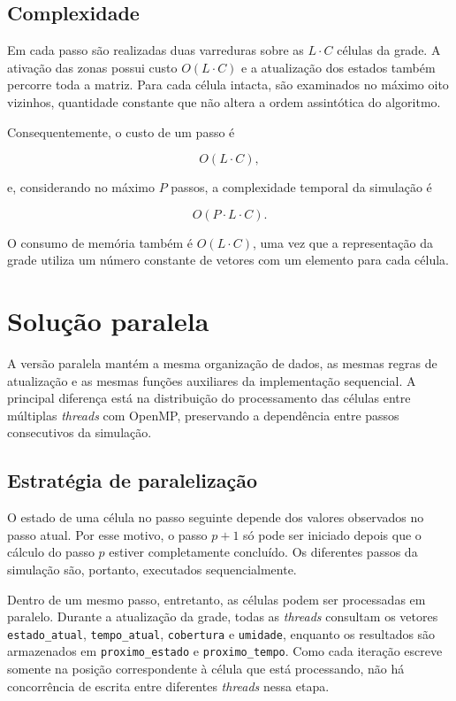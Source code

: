 \documentclass[11pt,a4paper]{article}
\begin{document}
\subsection{Complexidade}

Em cada passo são realizadas duas varreduras sobre as $L \cdot C$ células da grade. A ativação das zonas possui custo $O(L \cdot C)$ e a atualização dos estados também percorre toda a matriz. Para cada célula intacta, são examinados no máximo oito vizinhos, quantidade constante que não altera a ordem assintótica do algoritmo.

Consequentemente, o custo de um passo é

$$
O(L \cdot C),
$$

e, considerando no máximo $P$ passos, a complexidade temporal da simulação é

$$
O(P \cdot L \cdot C).
$$

O consumo de memória também é $O(L \cdot C)$, uma vez que a representação da grade utiliza um número constante de vetores com um elemento para cada célula.

\section{Solução paralela}
\label{sec:omp}

A versão paralela mantém a mesma organização de dados, as mesmas regras de atualização e as mesmas funções auxiliares da implementação sequencial. A principal diferença está na distribuição do processamento das células entre múltiplas \emph{threads} com OpenMP, preservando a dependência entre passos consecutivos da simulação.

\subsection{Estratégia de paralelização}

O estado de uma célula no passo seguinte depende dos valores observados no passo atual. Por esse motivo, o passo $p+1$ só pode ser iniciado depois que o cálculo do passo $p$ estiver completamente concluído. Os diferentes passos da simulação são, portanto, executados sequencialmente.

Dentro de um mesmo passo, entretanto, as células podem ser processadas em paralelo. Durante a atualização da grade, todas as \emph{threads} consultam os vetores \texttt{estado\_atual}, \texttt{tempo\_atual}, \texttt{cobertura} e \texttt{umidade}, enquanto os resultados são armazenados em \texttt{proximo\_estado} e \texttt{proximo\_tempo}. Como cada iteração escreve somente na posição correspondente à célula que está processando, não há concorrência de escrita entre diferentes \emph{threads} nessa etapa.
\end{document}
